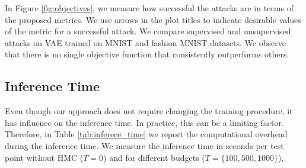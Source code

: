 
In Figure \ref{fig:objectives}, we measure how successful the attacks are in terms of the proposed metrics. We use arrows in the plot titles to indicate desirable values of the metric for a successful attack. We compare supervised and unsupervised attacks on VAE trained on MNIST and fashion MNIST datasets. We observe that there is no single objective function that consistently outperforms others. 


\subsection{Inference Time} \label{appendix:inference_time}


Even though our approach does not require changing the training procedure, it has influence on the inference time. In practice, this can be a limiting factor. Therefore, in Table \ref{tab:inferece_time} we report the computational overhead during the inference time. We measure the inference time in seconds per test point without HMC ($T=0$) and for different budgets ($T=\{100, 500, 1000\}$). 


